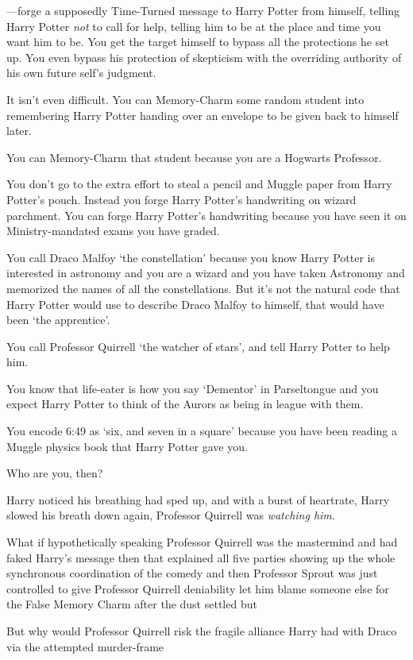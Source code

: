 —forge a supposedly Time-Turned message to Harry Potter from himself, telling
Harry Potter \emph{not} to call for help, telling him to be at the place and
time you want him to be. You get the target himself to bypass all the
protections he set up. You even bypass his protection of skepticism with the
overriding authority of his own future self's judgment.

It isn't even difficult. You can Memory-Charm some random student into
remembering Harry Potter handing over an envelope to be given back to himself
later.

You can Memory-Charm that student because you are a Hogwarts Professor.

You don't go to the extra effort to steal a pencil and Muggle paper from Harry
Potter's pouch. Instead you forge Harry Potter's handwriting on wizard
parchment. You can forge Harry Potter's handwriting because you have seen it on
Ministry-mandated exams you have graded.

You call Draco Malfoy `the constellation' because you know Harry Potter is
interested in astronomy and you are a wizard and you have taken Astronomy and
memorized the names of all the constellations. But it's not the natural code
that Harry Potter would use to describe Draco Malfoy to himself, that would
have been `the apprentice'.

You call Professor Quirrell `the watcher of stars', and tell Harry Potter to
help him.

You know that life-eater is how you say `Dementor' in Parseltongue and you
expect Harry Potter to think of the Aurors as being in league with them.

You encode 6:49 as `six, and seven in a square' because you have been reading a
Muggle physics book that Harry Potter gave you.

Who are you, then?

Harry noticed his breathing had sped up, and with a burst of heartrate, Harry
slowed his breath down again, Professor Quirrell was \emph{watching him}.

What if hypothetically speaking Professor Quirrell was the mastermind and had
faked Harry's message then that explained all five parties showing up the whole
synchronous coordination of the comedy and then Professor Sprout was just
controlled to give Professor Quirrell deniability let him blame someone else
for the False Memory Charm after the dust settled but

But why would Professor Quirrell risk the fragile alliance Harry had with Draco
via the attempted murder-frame

